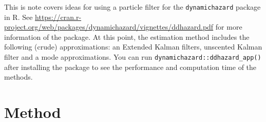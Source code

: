 \newcommand{\Lbrace}[1]{\left\{ #1\right\}}
\newcommand{\Lparen}[1]{\left( #1\right)}
\newcommand{\Cond}[2]{\left. #1 \vphantom{#2} \right\vert  #2}

\newcommand{\Prob}{\text{P}}
\newcommand{\VAR}{\text{Var}}
\newcommand{\E}{\text{E}}
\newcommand{\COV}{\text{E}}

\newcommand{\optor}[2]{#1\Lparen{#2}}
\newcommand{\optorC}[3]{\optor{#1}{\Cond{#2}{#3}}}

\newcommand{\prop}[1]{\optor{\Prob}{#1}}
\newcommand{\propC}[2]{\optorC{\Prob}{#1}{#2}}

\newcommand{\expec}[1]{\optor{\E}{#1}}
\newcommand{\expecC}[2]{\optorC{\E}{#1}{#2}}

\newcommand{\varp}[1]{\optor{\VAR}{#1}}
\newcommand{\varpC}[2]{\optorC{\VAR}{#1}{#2}}

\newcommand{\covp}[1]{\optor{\COV}{#1}}
\newcommand{\covpC}[2]{\optorC{\COV}{#1}{#2}}

\newcommand{\propAproxC}[2]{\optorC{\widetilde{p}}{#1}{#2}}

\newcommand{\normal}[2]{\optor{N}{#1,#2}}
\newcommand{\normalC}[3]{\optorC{N}{#1}{#2,#3}}

\newcommand{\IDC}[2]{\optorC{q}{#1}{#2}}
\newcommand{\IDAproxC}[2]{\optorC{\widetilde{q}}{#1}{#2}}

\newcommand{\diag}[1]{\optor{\text{diag}}{#1}}

\newcommand{\KF}[3]{#1_{\left. #2 \right\vert #3}}
\newcommand{\KFSup}[4]{#1_{\left. #2 \right\vert #3}^{(#4)}}

\newcommand{\partic}[3]{#1_{#2}^{\Lparen{#3}}}
\newcommand{\particB}[3]{\widetilde{#1}_{#2}^{\Lparen{#3}}}
\newcommand{\particS}[3]{\widehat{#1}_{#2}^{\Lparen{#3}}}

\newcommand{\bigO}[1]{\mathcal{O}\Lparen{#1}}


This is note covers ideas for using a particle filter for the \verb|dynamichazard| package in R. See \url{https://cran.r-project.org/web/packages/dynamichazard/vignettes/ddhazard.pdf} for more information of the package. At this point, the estimation method includes the following (crude) approximations: an Extended Kalman filters, unscented Kalman filter and a mode approximations. You can run \verb|dynamichazard::ddhazard_app()| after installing the package to see the performance and computation time of the methods.

\section{Method}
